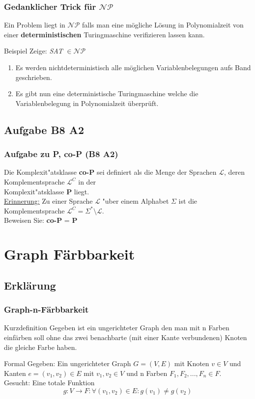 \begin{frame}
	\frametitle{Gedanklicher Trick für $\mathcal{NP}$}
	Ein Problem liegt in $\mathcal{NP}$ falls man eine mögliche Lösung in Polynomialzeit von einer \textbf{deterministischen} Turingmaschine verifizieren lassen kann.
	\begin{block}{Beispiel}
		Zeige: \emph{SAT} $\in \mathcal{NP}$
		\begin{enumerate}
			\item Es werden nichtdeterministisch alle möglichen Variablenbelegungen aufs Band geschrieben.
			\item Es gibt nun eine deterministische Turingmaschine welche die Variablenbelegung in Polynomialzeit überprüft.
		\end{enumerate}
	\end{block}
\end{frame}
\subsection{Aufgabe B8 A2}
\begin{frame}
	\frametitle{Aufgabe zu P, co-P (B8 A2)}
	Die Komplexit"atsklasse \textbf{co-P} sei definiert als die Menge der Sprachen
	$\mathcal{L}$, deren Komplementsprache $\mathcal{L}^C$ in der\\
	Komplexit"atsklasse \textbf{P} liegt.\\
	\underline{Erinnerung:} Zu einer Sprache $\mathcal{L}$ "uber einem Alphabet $\Sigma$
	ist die Komplementsprache $\mathcal{L}^C = \Sigma^* \setminus \mathcal{L}$.\\[4pt]
	Beweisen Sie: \textbf{co-P} = \textbf{P}
\end{frame}

\section{Graph Färbbarkeit}
\subsection{Erklärung}
\begin{frame}
	\frametitle{Graph-n-Färbbarkeit}
	\begin{block}{Kurzdefinition}
	Gegeben ist ein ungerichteter Graph den man mit n Farben einfärben soll ohne das zwei benachbarte (mit einer Kante verbundenen) Knoten die gleiche Farbe haben.\\
	\end{block}
	\begin{block}{Formal}
	Gegeben: Ein ungerichteter Graph $G = (V,E)$ mit Knoten $v \in V$ und Kanten $e=(v_1, v_2)\in E$ mit $v_1, v_2 \in V$ und n Farben $F_1, F_2 , ... , F_n \in F$.\\
	Gesucht: Eine totale Funktion \[g: V \rightarrow F:\forall(v_1,v_2)\in E: g(v_1)\not=g(v_2)\]
	\end{block}
\end{frame}
